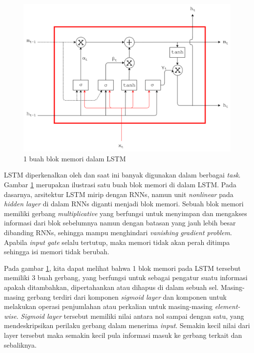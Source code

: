 \begin{figure}
	\centering
	\includegraphics[width=1.0\linewidth]{images/lstm}
	\caption{1 buah blok memori dalam LSTM}
	\label{fig:lstm}
\end{figure}

LSTM diperkenalkan oleh \cite{hochreiter1997long} dan saat ini banyak digunakan dalam berbagai \textit{task}. Gambar \ref{fig:lstm} merupakan ilustrasi satu buah blok memori di dalam LSTM. Pada dasarnya, arsitektur LSTM mirip dengan RNNs, namun unit \textit{nonlinear} pada \textit{hidden layer} di dalam RNNs diganti menjadi blok memori. Sebuah blok memori memiliki gerbang \textit{multiplicative} yang berfungsi untuk menyimpan dan mengakses informasi dari blok sebelumnya namun dengan batasan yang jauh lebih besar dibanding RNNs, sehingga mampu menghindari \textit{vanishing gradient problem}. Apabila \textit{input gate} selalu tertutup, maka memori tidak akan perah ditimpa sehingga isi memori tidak berubah.

Pada gambar \ref{fig:lstm}, kita dapat melihat bahwa 1 blok memori pada LSTM tersebut memiliki 3 buah gerbang, yang berfungsi untuk sebagai pengatur suatu informasi apakah ditambahkan, dipertahankan atau dihapus di dalam sebuah sel. Masing-masing gerbang terdiri dari komponen \textit{sigmoid layer} dan komponen untuk melakukan operasi penjumlahan atau perkalian untuk masing-masing \textit{element-wise}. \textit{Sigmoid layer} tersebut memiliki nilai antara nol sampai dengan satu, yang mendeskripsikan perilaku gerbang dalam menerima \textit{input}. Semakin kecil nilai dari layer tersebut maka semakin kecil pula informasi masuk ke gerbang terkait dan sebaliknya. 

